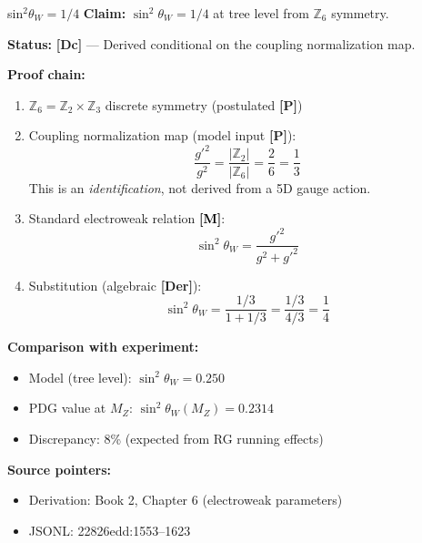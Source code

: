 \documentclass[11pt,a4paper]{article}
\newcommand{\tagP}{\textcolor{red!70!black}{\textbf{[P]}}}
\newcommand{\tagDc}{\textcolor{blue!70!black}{\textbf{[Dc]}}}
\newcommand{\tagDer}{\textcolor{green!50!black}{\textbf{[Der]}}}
\newcommand{\tagM}{\textcolor{black}{\textbf{[M]}}}
\begin{document}
\begin{capsulebox}{sin$^2\theta_W = 1/4$}
\textbf{Claim:} $\sin^2\theta_W = 1/4$ at tree level from $\mathbb{Z}_6$ symmetry.

\textbf{Status:} \tagDc{} --- Derived conditional on the coupling normalization map.

\textbf{Proof chain:}
\begin{enumerate}
    \item $\mathbb{Z}_6 = \mathbb{Z}_2 \times \mathbb{Z}_3$ discrete symmetry (postulated \tagP{})

    \item Coupling normalization map (model input \tagP{}):
    \begin{equation}
        \frac{g'^2}{g^2} = \frac{|\mathbb{Z}_2|}{|\mathbb{Z}_6|} = \frac{2}{6} = \frac{1}{3}
    \end{equation}
    This is an \emph{identification}, not derived from a 5D gauge action.

    \item Standard electroweak relation \tagM{}:
    \begin{equation}
        \sin^2\theta_W = \frac{g'^2}{g^2 + g'^2}
    \end{equation}

    \item Substitution (algebraic \tagDer{}):
    \begin{equation}
        \sin^2\theta_W = \frac{1/3}{1 + 1/3} = \frac{1/3}{4/3} = \frac{1}{4}
    \end{equation}
\end{enumerate}

\textbf{Comparison with experiment:}
\begin{itemize}[nosep]
    \item Model (tree level): $\sin^2\theta_W = 0.250$
    \item PDG value at $M_Z$: $\sin^2\theta_W(M_Z) = 0.2314$
    \item Discrepancy: 8\% (expected from RG running effects)
\end{itemize}

\textbf{Source pointers:}
\begin{itemize}[nosep]
    \item Derivation: Book 2, Chapter 6 (electroweak parameters)
    \item JSONL: 22826edd:1553--1623
\end{itemize}
\end{capsulebox}
\end{document}

